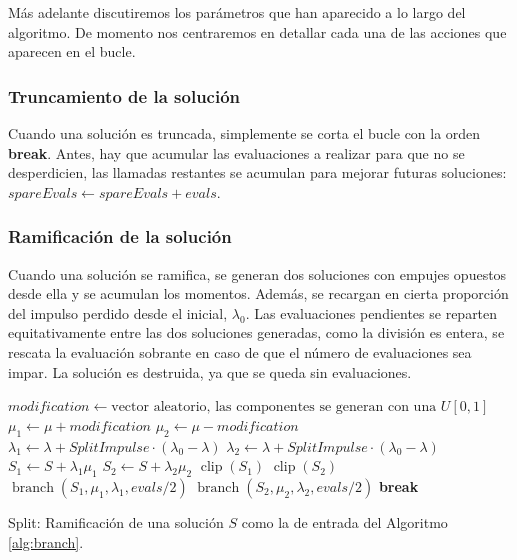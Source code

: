 \documentclass{article}
\begin{document}
Más adelante discutiremos los parámetros que han aparecido a lo largo del algoritmo. De momento nos centraremos en detallar cada una de las
acciones que aparecen en el bucle.

\subsubsection*{Truncamiento de la solución}
Cuando una solución es truncada, simplemente se corta el bucle con la orden \textbf{break}. Antes, hay que acumular las evaluaciones a
realizar para que no se desperdicien, las llamadas restantes se acumulan para mejorar futuras soluciones: $spareEvals\gets spareEvals+evals$.

\subsubsection*{Ramificación de la solución}

Cuando una solución se ramifica, se generan dos soluciones con empujes opuestos desde ella y se acumulan los momentos. Además, se
recargan en cierta proporción del impulso perdido desde el inicial, $\lambda_0$. Las evaluaciones pendientes se reparten equitativamente
entre las dos soluciones generadas, como la división es entera, se rescata la evaluación sobrante en caso de que el número de evaluaciones
sea impar. La solución es destruida, ya que se queda sin evaluaciones.

 \begin{algorithm}[H]
	\DontPrintSemicolon %
	$modification\gets\text{vector aleatorio, las componentes se generan con una $U[0,1]$}$\;
	$\mu_1\gets \mu + modification$ 
	$\mu_2\gets \mu - modification$\;
	$\lambda_1\gets \lambda+SplitImpulse\cdot(\lambda_0-\lambda)$ 
	$\lambda_2\gets \lambda+SplitImpulse\cdot(\lambda_0-\lambda)$\;
	$S_1 \gets S+\lambda_1 \mu_1$\;
	$S_2 \gets S+\lambda_2 \mu_2$\;
	$\operatorname{clip}(S_1)$ 
	$\operatorname{clip}(S_2)$\;
	$\operatorname{branch}(S_1, \mu_1, \lambda_1, evals/2)$\;
	$\operatorname{branch}(S_2, \mu_2, \lambda_2, evals/2)$\;
	\textbf{break} 
	\caption{{\sc Split:} Ramificación de una solución $S$ como la de entrada del Algoritmo \ref{alg:branch}.}
	\label{alg:split}
\end{algorithm}
\end{document}
